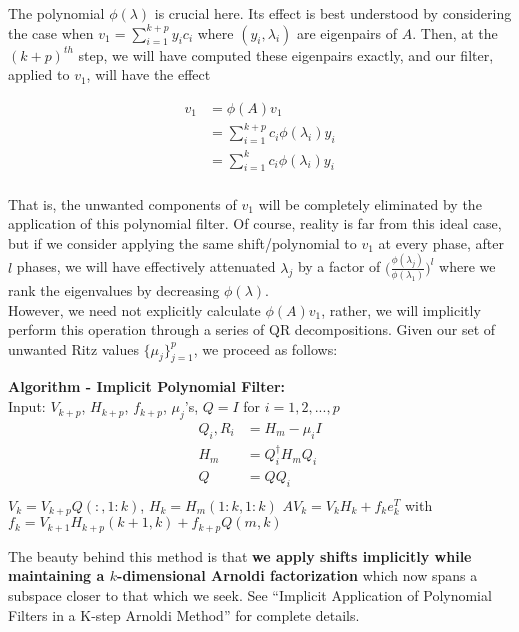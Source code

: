 \documentclass[11pt]{article}
\begin{document}
The polynomial $\phi(\lambda)$ is crucial here. Its effect is best understood by considering the case when $v_1 = \sum \limits_{i=1}^{k+p} y_i c_i$ where $(y_i, \lambda_i)$ are eigenpairs of $A$. Then, at the $(k+p)^{th}$ step, we will have computed these eigenpairs exactly, and our filter, applied to $v_1$, will have the effect

\begin{align*}
  v_1 &= \phi(A) v_1 \\
  &= \sum \limits_{i=1}^{k+p}  c_i \phi(\lambda_i) y_i \\
  &= \sum \limits_{i=1}^k c_i \phi(\lambda_i) y_i \\
\end{align*}

That is, the unwanted components of $v_1$ will be completely eliminated by the application of this polynomial filter. Of course, reality is far from this ideal case, but if we consider applying the same shift/polynomial to $v_1$ at every phase, after $l$ phases, we will have effectively attenuated $\lambda_j$ by a factor of $\bigg( \frac{\phi(\lambda_j)}{\phi(\lambda_1)} \bigg)^l$ where we rank the eigenvalues by decreasing $\phi(\lambda)$. \\

However, we need not explicitly calculate $\phi(A) v_1$, rather, we will implicitly perform this operation through a series of QR decompositions. Given our set of unwanted Ritz values $\{ \mu_j \}_{j=1}^p$, we proceed as follows:

\begin{framed}
  \noindent \textbf{Algorithm - Implicit Polynomial Filter:} \\
  \hspace*{5mm} Input: $V_{k+p}$, $H_{k+p}$, $f_{k+p}$, $\mu_j$'s, $Q = I$
  \hspace*{5mm} for $i=1,2,...,p$
  \begin{align*}
    Q_i, R_i &= H_m - \mu_i I \\
    H_m &= Q_i^\dagger H_m Q_i \\
    Q &= Q Q_i \\
  \end{align*}
  \hspace*{5mm} $V_k = V_{k+p} Q(:, 1:k)$, $H_k = H_m(1:k, 1:k)$
  \hspace*{5mm} $A V_k = V_k H_k + f_k e_k^T$ with $f_k = V_{k+1} H_{k+p}(k+1, k) + f_{k+p} Q(m,k)$
\end{framed}

The beauty behind this method is that \textbf{we apply shifts implicitly while maintaining a $k$-dimensional Arnoldi factorization} which now spans a subspace closer to that which we seek. See ``Implicit Application of Polynomial Filters in a K-step Arnoldi Method'' for complete details. \\
\end{document}
